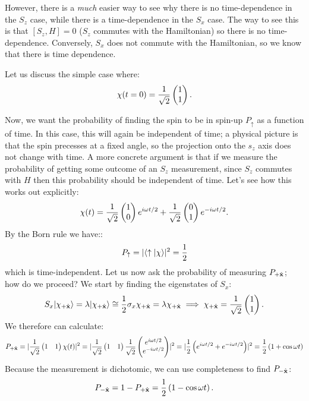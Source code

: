 However, there is a \emph{much} easier way to see why there is no time-dependence in the $S_z$ case, while there is a time-dependence in the $S_x$ case. The way to see this is that $[S_z, H] = 0$ ($S_z$ commutes with the Hamiltonian) so there is no time-dependence. Conversely, $S_x$ does not commute with the Hamiltonian, so we know that there is time dependence.

Let us discuss the simple case where:
\begin{equation}
    \chi(t = 0) = \frac{1}{\sqrt{2}}
    \begin{pmatrix}1\\1\end{pmatrix}.
\end{equation}

Now, we want the probability of finding the spin to be in spin-up $P_\uparrow$ as a function of time. In this case, this will again be independent of time; a physical picture is that the spin precesses at a fixed angle, so the projection onto the $s_z$ axis does not change with time. A more concrete argument is that if we measure the probability of getting some outcome of an $S_z$ measurement, since $S_z$ commutes with $H$ then this probability should be independent of time. Let's see how this works out explicitly:
\begin{equation}
    \chi(t) = \frac{1}{\sqrt{2}}\begin{pmatrix}1\\0\end{pmatrix}e^{i\omega t/2} + \frac{1}{\sqrt{2}}\begin{pmatrix}0\\1\end{pmatrix}e^{-i\omega t/2}.
\end{equation}
By the Born rule we have::
\begin{equation}
    P_\uparrow = \lvert \langle \uparrow \lvert \chi \rangle \rvert^2 = \frac{1}{2}
\end{equation}
which is time-independent. Let us now ask the probability of measuring $P_{+\hat{\mathbf{x}}}$; how do we proceed? We start by finding the eigenstates of $S_x$:
\begin{equation}
    S_x \lvert \chi_{+\hat{\mathbf{x}}} \rangle = \lambda \lvert \chi_{+\hat{\mathbf{x}}} \rangle \cong \frac{1}{2}\sigma_x\chi_{+\hat{\mathbf{x}}} = \lambda \chi_{+\hat{\mathbf{x}}} \implies \chi_{+\hat{\mathbf{x}}} = \frac{1}{\sqrt{2}}\begin{pmatrix}1\\1\end{pmatrix}.
\end{equation}
We therefore can calculate:
\begin{equation}
    P_{+\hat{\mathbf{x}}} = \lvert \frac{1}{\sqrt{2}}\begin{pmatrix}1 & 1\end{pmatrix}\chi(t) \rvert^2 = \lvert \frac{1}{\sqrt{2}}\begin{pmatrix}1 & 1\end{pmatrix}\frac{1}{\sqrt{2}}\begin{pmatrix}e^{i\omega t/2} \\ e^{-i\omega t/2}\end{pmatrix} \rvert^2 = \lvert \frac{1}{2}\left(e^{i\omega t/2} + e^{-i\omega t/2}\right) \rvert^2 = \frac{1}{2}\left(1 + \cos\omega t\right)
\end{equation}
Because the measurement is dichotomic, we can use completeness to find $P_{-\hat{\mathbf{x}}}$:
\begin{equation}
    P_{-\hat{\mathbf{x}}} = 1 - P_{+\hat{\mathbf{x}}} = \frac{1}{2}\left(1 - \cos\omega t\right).
\end{equation}
